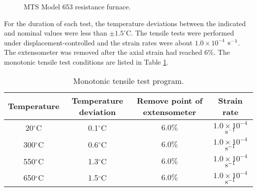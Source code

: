 
\begin{figure}[!htp]
\caption{MTS Model 653 resistance furnace.}
\label{Fig:Furnace653_1}
\end{figure}

For the duration of each test, the temperature deviations between the indicated and nominal values were less than $\pm1.5^{\circ}$C.
The tensile tests were performed under displacement-controlled and the strain rates were about $1.0\times 10^{-4}$ $\rm{s}^{-1}$.
The extensometer was removed after the axial strain had reached 6\%.
The monotonic tensile test conditions are listed in Table \ref{tab:TensionLoadingConditions}.
\begin{table}[htbp]
  \centering
  \caption{Monotonic tensile test program.}
    \begin{tabular}{cccc}
    \toprule
    Temperature & Temperature deviation & Remove point of extensometer  & Strain rate  \\
    \midrule
    20$^{\circ}$C  & 0.1$^{\circ}$C & $6.0\%$ & $1.0\times 10^{-4}$ $\rm{s}^{-1}$ \\
    300$^{\circ}$C & 0.6$^{\circ}$C & $6.0\%$ & $1.0\times 10^{-4}$ $\rm{s}^{-1}$ \\
    550$^{\circ}$C & 1.3$^{\circ}$C & $6.0\%$ & $1.0\times 10^{-4}$ $\rm{s}^{-1}$ \\
    650$^{\circ}$C & 1.5$^{\circ}$C & $6.0\%$ & $1.0\times 10^{-4}$ $\rm{s}^{-1}$ \\
    \bottomrule
    \end{tabular}%
  \label{tab:TensionLoadingConditions}%
\end{table}%

